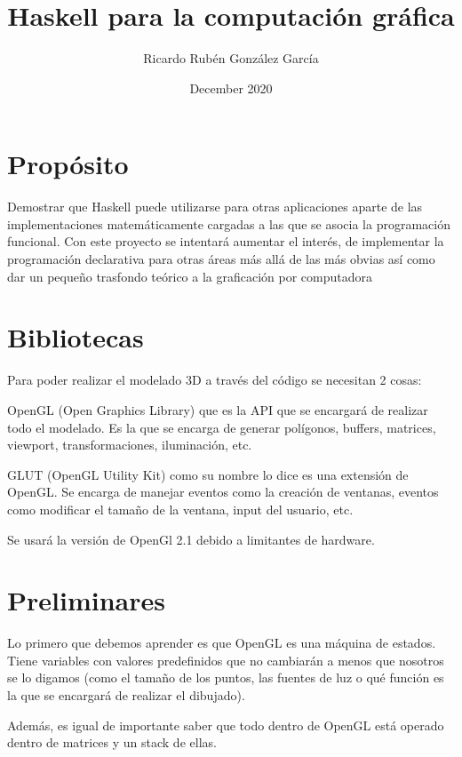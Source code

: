 \documentclass{article}
\title{Haskell para la computación gráfica}
\author{Ricardo Rubén González García }
\date{December 2020}
\begin{document}
\maketitle

\section{Propósito}
Demostrar que Haskell puede utilizarse para otras aplicaciones 
aparte de las implementaciones matemáticamente cargadas a las que
se asocia la programación funcional. Con este proyecto se 
intentará aumentar el interés, 
de implementar la programación declarativa para otras áreas más
allá de las más obvias así como dar un pequeño trasfondo teórico a la graficación por computadora

\section{Bibliotecas}
Para poder realizar el modelado 3D a través del código se necesitan 2 cosas:

OpenGL (Open Graphics Library) que es la API que se encargará de realizar todo el modelado. Es la que se encarga de generar polígonos, buffers, matrices, viewport, transformaciones, iluminación, etc.

GLUT (OpenGL Utility Kit) como su nombre lo dice es una extensión de OpenGL. Se encarga de manejar eventos como la creación de ventanas, eventos como modificar el tamaño de la ventana, input del usuario, etc. 

Se usará la versión de OpenGl 2.1 debido a limitantes de hardware.
\section{Preliminares}

Lo primero que debemos aprender es que OpenGL es una máquina de estados. Tiene variables con valores predefinidos que no 
cambiarán a menos que nosotros se lo digamos (como el tamaño de los puntos, las fuentes de luz o qué función es la que se encargará de realizar el dibujado).

Además, es igual de importante saber que todo dentro de OpenGL está operado dentro de matrices y un stack de ellas. 
\end{document}
